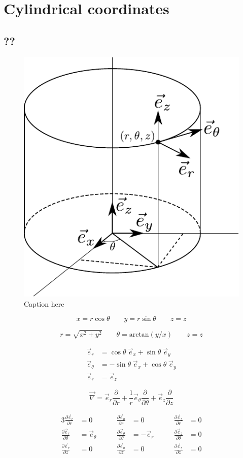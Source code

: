 \documentclass[times,namecite]{goose-article}
\begin{document}
\section{Cylindrical coordinates}

\subsection{??}

\begin{figure}[htp]
  \centering
  \includegraphics[width=.2\textwidth]{figures/cylindrical_coordinates}
  \caption{Caption here}
  \label{fig:}
\end{figure}

\begin{equation}
  x = r \cos \theta \qquad
  y = r \sin \theta \qquad
  z = z
\end{equation}

\begin{equation}
  r      = \sqrt{ x^2 + y^2 }                \qquad
  \theta = \mathrm{arctan}\left( y/x \right) \qquad
  z      = z
\end{equation}

\begin{align}
  \vec{e}_r      &=   \cos \theta \; \vec{e}_x + \sin \theta \; \vec{e}_y \nonumber \\
  \vec{e}_\theta &= - \sin \theta \; \vec{e}_x + \cos \theta \; \vec{e}_y \nonumber \\
  \vec{e}_r      &= \vec{e}_z
\end{align}





\begin{equation}
  \vec{\nabla} =
  \vec{e}_r \frac{\partial}{\partial r} +
  \frac{1}{r} \vec{e}_\theta \frac{\partial}{\partial \theta} +
  \vec{e}_z \frac{\partial}{\partial z}
\end{equation}

\begin{alignat}{3}
  \frac{\partial \vec{e}_r}{\partial r     } &= 0              &\qquad \frac{\partial \vec{e}_\theta}{\partial r     } &= 0           &\qquad \frac{\partial \vec{e}_z}{\partial r     } &= 0 \nonumber \\
  \frac{\partial \vec{e}_r}{\partial \theta} &= \vec{e}_\theta &\qquad \frac{\partial \vec{e}_\theta}{\partial \theta} &= - \vec{e}_r &\qquad \frac{\partial \vec{e}_z}{\partial \theta} &= 0 \nonumber \\
  \frac{\partial \vec{e}_r}{\partial z     } &= 0              &\qquad \frac{\partial \vec{e}_\theta}{\partial z     } &= 0           &\qquad \frac{\partial \vec{e}_z}{\partial z     } &= 0
\end{alignat}
\end{document}
